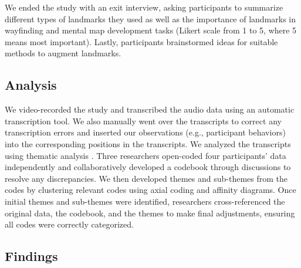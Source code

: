 
We ended the study with an exit interview, asking participants to summarize different types of landmarks they used as well as the importance of landmarks in wayfinding and mental map development tasks (Likert scale from 1 to 5, where 5 means most important). Lastly, participants brainstormed ideas for suitable methods to augment landmarks.  %


\subsection{Analysis}
We video-recorded the study and transcribed the audio data using an automatic transcription tool. We also manually went over the transcripts to correct any transcription errors and inserted our observations (e.g., participant behaviors) into the corresponding positions in the transcripts. We analyzed the transcripts using thematic analysis \cite{braun2006using,clarke2017thematic}. Three researchers open-coded four participants' data independently and collaboratively developed a codebook through discussions to resolve any discrepancies. We then developed themes and sub-themes from the codes by clustering relevant codes using axial coding and affinity diagrams. Once initial themes and sub-themes were identified, researchers cross-referenced the original data, the codebook, and the themes to make final adjustments, ensuring all codes were correctly categorized.

\subsection{Findings}

